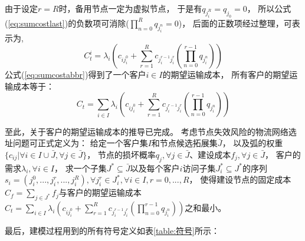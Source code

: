 由于设定$r=R$时，备用节点一定为虚拟节点，
于是有$q_{j_i^R} = q_{j_0} = 0$，
所以公式(\ref{eq:sumcostlast})的负数项可消除($\prod_{n=0}^{R} q_{j_i^n}=0$)，
后面的正数项经过整理，可表示为,
\begin{equation}
\label{eq:sumcostabbr}
C_t^i = \lambda_i
\left( 
    c_{ij_{i}^0} + \sum_{r=1}^R c_{j_i^{r-1}j_i^{r}}(\prod_{n=0}^{r-1} q_{j_i^n})
\right)
\end{equation}
公式(\ref{eq:sumcostabbr})得到了一个客户$i\in I$的期望运输成本，
所有客户的期望运输成本等于：
\begin{equation}
C_t = \sum_{i\in I}\lambda_i
\left( 
    c_{ij_{i}^0} + \sum_{r=1}^R c_{j_i^{r-1}j_i^{r}}(\prod_{n=0}^{r-1} q_{j_i^n})
\right)
\end{equation}

至此，关于客户的期望运输成本的推导已完成。
考虑节点失效风险的物流网络选址问题可正式定义为：
给定一个客户集$I$和节点候选拓展集$\bar{J}$，
以及弧的权重$\{c_{ij}|\forall i \in I\cup \bar{J},\forall j\in \bar{J}\}$，
节点的损坏概率$q_j,\forall j\in \bar{J}$、建设成本$f_j,\forall j\in \bar{J}$，
客户的需求$\lambda_i,\forall i \in I$，
求一个子集$J^*\subseteq \bar{J}$以及每个客户$i$访问子集$J_i^*\subseteq J^*$的序列$s_i = (j_i^0,...,j_i^r,...,j_i^R),\forall j_i^r \in J_i^*,\forall i\in I, r=0,...,R$，
使得建设节点的固定成本$C_f=\sum_{j\in J^*}f_j$与客户的期望运输成本$C_t=\sum_{i\in I}\lambda_i
\left( c_{ij_{i}^0} + \sum_{r=1}^R c_{j_i^{r-1}j_i^{r}}(\prod_{n=0}^{r-1} q_{j_i^n})\right)$之和最小。

最后，建模过程用到的所有符号定义如表\ref{table:符号}所示：

